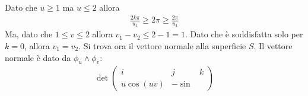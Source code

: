\documentclass[a4paper, oneside]{book}
\begin{document}
Dato che $u \geq 1$ ma $ u \leq 2$ allora 
\begin{gather*}
    \frac{2k\pi}{u_1} \geq 2\pi \geq \frac{2\pi}{u_1}
\end{gather*}
Ma, dato che $1 \leq v \leq 2$ allora $v_1 - v_2 \leq 2 - 1 = 1$. Dato che 
è soddisfatta solo per $k = 0$, allora $v_1 = v_2$. Si trova ora il vettore normale 
alla superficie $S$. Il vettore normale è dato da $\phi_u \wedge \phi_v$: 
\begin{gather*}
    \det \begin{pmatrix}
        i & j & k \\
        u\cos(uv) & -\sin
    \end{pmatrix}
\end{gather*}
\end{document}
